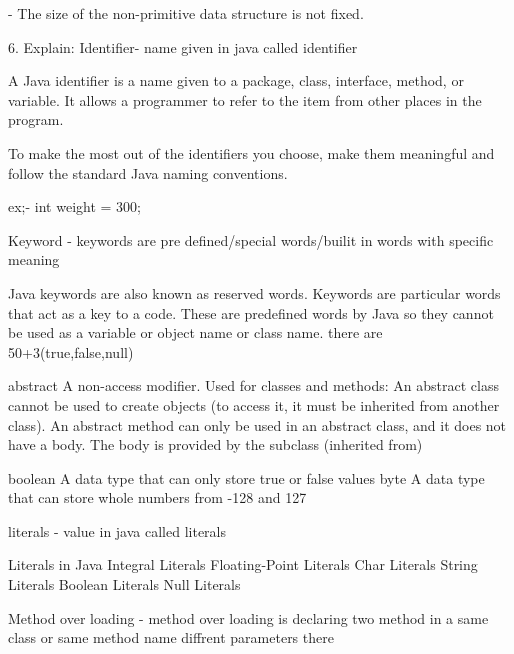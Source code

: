 {                        - The size of the non-primitive data structure is not fixed.
						
						
						
						
						6. Explain:
                                       Identifier- name given in java called identifier
									   
									   A Java identifier is a name given to a package, class, interface, method, or variable. It allows a programmer to refer to the item from other places in the program.

                                       To make the most out of the identifiers you choose, make them meaningful and follow the standard Java naming conventions.

                                       ex;-  int weight = 300;


                                       Keyword - keywords are pre defined/special words/builit in words with specific meaning 
									   
									   Java keywords are also known as reserved words. Keywords are particular words that act as a key to a code. These are predefined words by Java so they cannot be used as a variable or object name or class name.
                                       there are 50+3(true,false,null)

									   
									   abstract	A non-access modifier. Used for classes and methods: An abstract class cannot be used to create objects (to access it, it must be inherited from another class). An abstract method can only be used in an abstract class, and it does not have a body. The body is provided by the subclass (inherited from)

                                        boolean	A data type that can only store true or false values
                                        byte	A data type that can store whole numbers from -128 and 127



									  literals - value in java called literals
   
											Literals in Java
											Integral Literals
											Floating-Point Literals
											Char Literals
											String Literals
											Boolean Literals
											Null Literals
											
											
											
                                     Method over loading - method over loading is declaring two method in a same class or same method name diffrent parameters there
											

}
